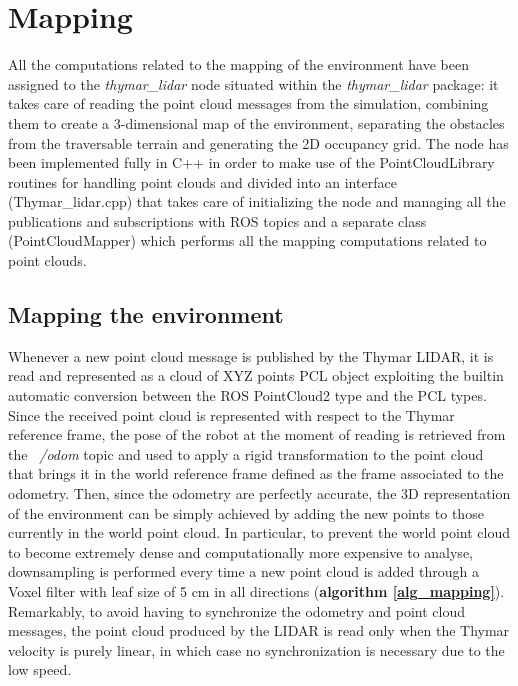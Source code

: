 \documentclass[9pt,conference]{IEEEtran}
\begin{document}


\section{Mapping}

All the computations related to the mapping of the environment have been assigned to the \emph{thymar\_lidar} node situated within the \emph{thymar\_lidar} package: it takes care of reading the point cloud messages from the simulation, combining them to create a 3-dimensional map of the environment, separating the obstacles from the traversable terrain and generating the 2D occupancy grid. The node has been implemented fully in C++ in order to make use of the PointCloudLibrary \cite{PCL} routines for handling point clouds and divided into an interface (Thymar\_lidar.cpp) that takes care of initializing the node and managing all the publications and subscriptions with ROS topics and a separate class (PointCloudMapper) which performs all the mapping computations related to point clouds.


\subsection{Mapping the environment}

Whenever a new point cloud message is published by the Thymar LIDAR, it is read and represented as a cloud of XYZ points PCL object exploiting the builtin automatic conversion between the ROS PointCloud2 type and the PCL types. Since the received point cloud is represented with respect to the Thymar reference frame, the pose of the robot at the moment of reading is retrieved from the \emph{~/odom} topic and used to apply a rigid transformation to the point cloud that brings it in the world reference frame defined as the frame associated to the odometry. Then, since the odometry are perfectly accurate, the 3D representation of the environment can be simply achieved by adding the new points to those currently in the world point cloud. In particular, to prevent the world point cloud to become extremely dense and computationally more expensive to analyse, downsampling is performed every time a new point cloud is added through a Voxel filter with leaf size of 5 cm in all directions (\textbf{algorithm \ref{alg_mapping}}). Remarkably, to avoid having to synchronize the odometry and point cloud messages, the point cloud produced by the LIDAR is read only when the Thymar velocity is purely linear, in which case no synchronization is necessary due to the low speed.
\end{document}
